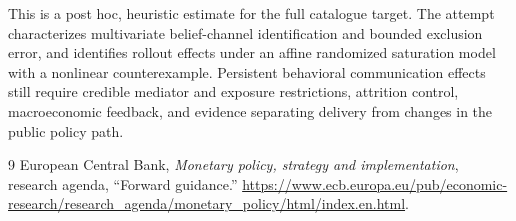 \documentclass[11pt]{article}
\theoremstyle{definition}
\begin{document}
This is a post hoc, heuristic estimate for the full catalogue target.
The attempt characterizes multivariate belief-channel identification and bounded exclusion error, and identifies rollout effects under an affine randomized saturation model with a nonlinear counterexample. Persistent behavioral communication effects still require credible mediator and exposure restrictions, attrition control, macroeconomic feedback, and evidence separating delivery from changes in the public policy path.

\begin{thebibliography}{9}
 European Central Bank, \emph{Monetary policy, strategy and implementation}, research agenda, ``Forward guidance.'' \url{https://www.ecb.europa.eu/pub/economic-research/research_agenda/monetary_policy/html/index.en.html}.
\end{thebibliography}
\end{document}
